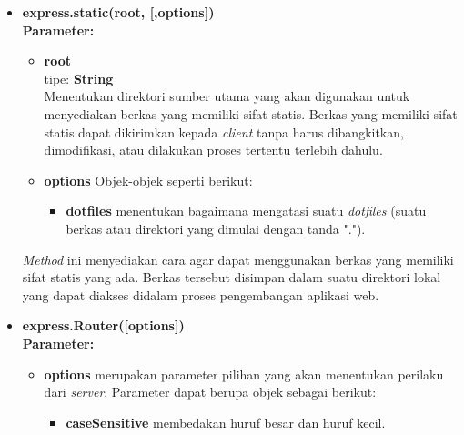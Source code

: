 \begin{itemize}
%			

	\item \textbf{express.static(root, [,options])} \\
	\textbf{Parameter:}
	\begin{itemize}
		\item \textbf{root} \\ tipe: \textbf{String} \\ Menentukan direktori sumber utama yang akan digunakan untuk menyediakan berkas yang memiliki sifat statis. Berkas yang memiliki sifat statis dapat dikirimkan kepada \textit{client} tanpa harus dibangkitkan, dimodifikasi, atau dilakukan proses tertentu terlebih dahulu.
		\item \textbf{options} Objek-objek seperti berikut:
			\begin{itemize}
				\item \textbf{dotfiles} menentukan bagaimana mengatasi suatu \textit{dotfiles} (suatu berkas atau direktori yang dimulai dengan tanda ".").
			\end{itemize}
	\end{itemize}
	
	\textit{Method} ini menyediakan cara agar dapat menggunakan berkas yang memiliki sifat statis yang ada. Berkas tersebut disimpan dalam suatu direktori lokal yang dapat diakses didalam proses pengembangan aplikasi web.
	
	\item \textbf{express.Router([options])} \\
	\textbf{Parameter:}
	\begin{itemize}
		\item \textbf{options} merupakan parameter pilihan yang akan menentukan perilaku dari \textit{server}. Parameter dapat berupa objek sebagai berikut:
		\begin{itemize}
			\item \textbf{caseSensitive} membedakan huruf besar dan huruf kecil.
		\end{itemize}
	\end{itemize}


\end{itemize}
